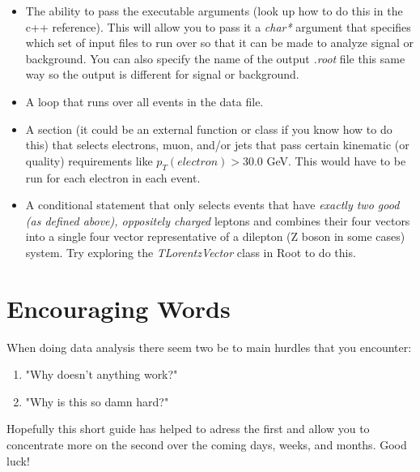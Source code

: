 \documentclass[12pt]{article}
\begin{document}
\begin{itemize}
\item The ability to pass the executable arguments (look up how to do this in the c++ reference).  This will allow you to pass it a \textit{char*} argument that specifies which set of input files to run over so that it can be made to analyze signal or background.  You can also specify the name of the output \textit{.root} file this same way so the output is different for signal or background.
\item A loop that runs over all events in the data file.
\item A section (it could be an external function or class if you know how to do this) that selects electrons, muon, and/or jets that pass certain kinematic (or quality) requirements like $p_{T}(electron)>30.0$ GeV.  This would have to be run for each electron in each event.
\item A conditional statement that only selects events that have \textit{exactly two good (as defined above), oppositely charged} leptons and combines their four vectors into a single four vector representative of a dilepton (Z boson in some cases) system.  Try exploring the \textit{TLorentzVector} class in Root to do this.
\end{itemize}



\section{Encouraging Words}
When doing data analysis there seem two be to main hurdles that you encounter:
\begin{enumerate}
\item "Why doesn't anything work?"
\item "Why is this so damn hard?"
\end{enumerate}
Hopefully this short guide has helped to adress the first and allow you to concentrate more on the second over the coming days, weeks, and months.  Good luck!

\end{document}
